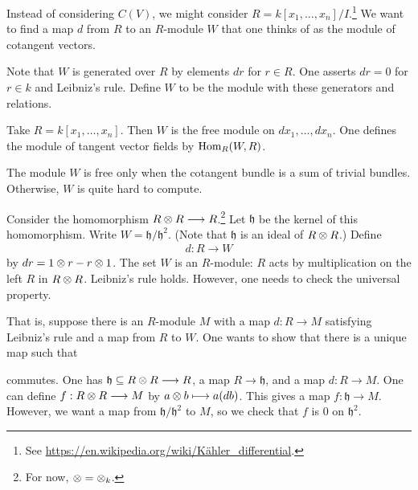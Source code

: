 \documentclass [11 pt, oneside, margin = 1 in] {article}
\begin{document}
Instead of considering $C(V)$, we might consider $R=k[x_1,\hdots, x_n]/I$.\footnote{See \url{https://en.wikipedia.org/wiki/Kähler_differential}.} We want to find a map $d$ from $R$ to an $R$-module $W$ that one thinks of as the module of cotangent vectors.

Note that $W$ is generated over $R$ by elements $dr$ for $r\in R$. One asserts $dr=0$ for $r\in k$ and Leibniz's rule. Define $W$ to be the module with these generators and relations.

\begin{example}[ ]\label{}\text{}
Take $R=k[x_1,\hdots, x_n]$. Then $W$ is the free module on $dx_1,\hdots, dx_n$. One defines the module of tangent vector fields by $\operatorname{Hom}_{R}(W, R)$.
\end{example}

\begin{remark}
	The module $W$ is free only when the cotangent bundle is a sum of trivial bundles. Otherwise, $W$ is quite hard to compute.
\end{remark}

Consider the homomorphism $R\otimes R\longrightarrow R$.\footnote{For now, $\otimes=\otimes_k$.} Let $\mathfrak{h}$ be the kernel of this homomorphism. Write $W = \mathfrak{h}/\mathfrak{h}^2$. (Note that $\mathfrak{h}$ is an ideal of $R\otimes R$.) Define 
\begin{align*}
	d :R\longrightarrow W
\end{align*}
by $dr = 1\otimes r - r\otimes 1$. The set $W$ is an $R$-module: $R$ acts by multiplication on the left $R$ in $R\otimes R$. Leibniz's rule holds. However, one needs to check the universal property.

That is, suppose there is an $R$-module $M$ with a map $d:R\longrightarrow M$ satisfying Leibniz's rule and a map from $R$ to $W$. One wants to show that there is a unique map such that
\begin{center}
\end{center}
commutes. One has $\mathfrak{h}\subseteq R\otimes R\longrightarrow R$, a map $R\longrightarrow \mathfrak{h}$, and a map $d:R\longrightarrow M$. One can define $f:R\otimes R\longrightarrow M$ by $a\otimes b \longmapsto a(db)$. This gives a map $f:\mathfrak{h}\longrightarrow M$. However, we want a map from $\mathfrak{h}/\mathfrak{h}^2$ to $M$, so we check that $f$ is $0$ on $\mathfrak{h}^2$.
\end{document}
